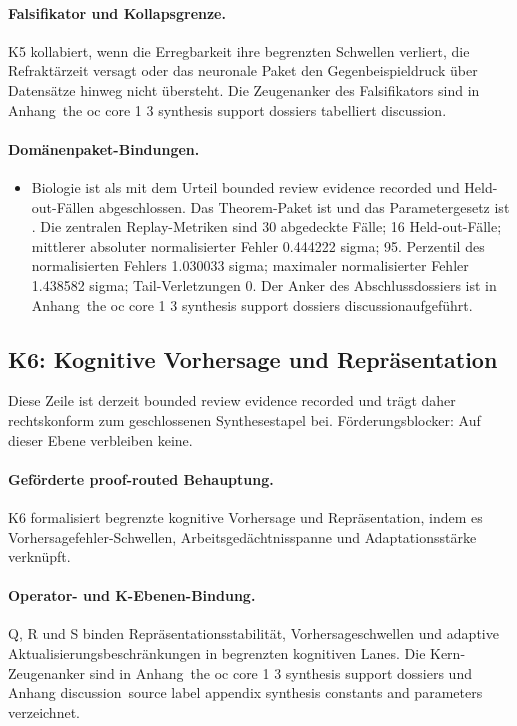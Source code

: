 \paragraph{Falsifikator und Kollapsgrenze.}
K5 kollabiert, wenn die Erregbarkeit ihre begrenzten Schwellen verliert, die Refraktärzeit versagt oder das neuronale Paket den Gegenbeispieldruck über Datensätze hinweg nicht übersteht.
Die Zeugenanker des Falsifikators sind in Anhang~the oc core 1 3 synthesis support dossiers tabelliert discussion.

\paragraph{Domänenpaket-Bindungen.}
\begin{itemize}[leftmargin=1.6em,nosep]
\item Biologie ist als  mit dem Urteil bounded review evidence recorded und  Held-out-Fällen abgeschlossen. Das Theorem-Paket ist  und das Parametergesetz ist . Die zentralen Replay-Metriken sind 30 abgedeckte Fälle; 16 Held-out-Fälle; mittlerer absoluter normalisierter Fehler 0.444222 sigma; 95. Perzentil des normalisierten Fehlers 1.030033 sigma; maximaler normalisierter Fehler 1.438582 sigma; Tail-Verletzungen 0. Der Anker des Abschlussdossiers ist in Anhang~the oc core 1 3 synthesis support dossiers discussionaufgeführt.
\end{itemize}

\subsection{K6: Kognitive Vorhersage und Repräsentation}
\label{sec:oc-core-1-3-synthesis-k6}
Diese Zeile ist derzeit bounded review evidence recorded und trägt daher rechtskonform zum geschlossenen Synthesestapel bei.
Förderungsblocker: Auf dieser Ebene verbleiben keine.

\paragraph{Geförderte proof-routed Behauptung.}
K6 formalisiert begrenzte kognitive Vorhersage und Repräsentation, indem es Vorhersagefehler-Schwellen, Arbeitsgedächtnisspanne und Adaptationsstärke verknüpft.

\paragraph{Operator- und K-Ebenen-Bindung.}
Q, R und S binden Repräsentationsstabilität, Vorhersageschwellen und adaptive Aktualisierungsbeschränkungen in begrenzten kognitiven Lanes.
Die Kern-Zeugenanker sind in Anhang~the oc core 1 3 synthesis support dossiers und Anhang discussion~source label appendix synthesis constants and parameters verzeichnet.

